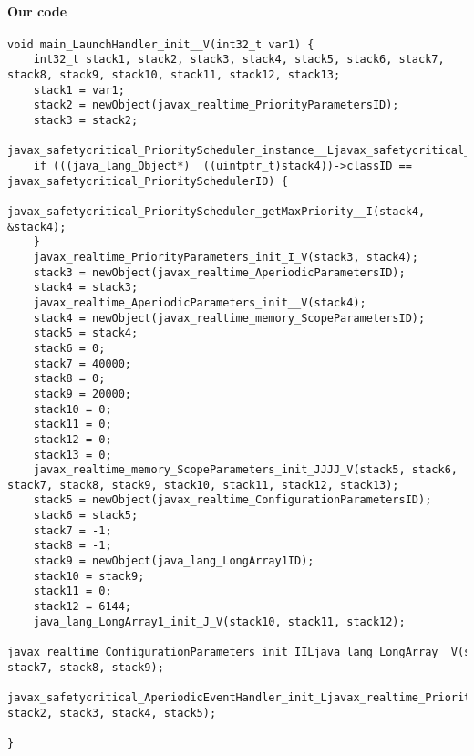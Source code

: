 \paragraph{Our code}\hfill
\begin{lstlisting}[firstnumber=2612]
void main_LaunchHandler_init__V(int32_t var1) {
	int32_t stack1, stack2, stack3, stack4, stack5, stack6, stack7, stack8, stack9, stack10, stack11, stack12, stack13;
	stack1 = var1;
	stack2 = newObject(javax_realtime_PriorityParametersID);
	stack3 = stack2;
	javax_safetycritical_PriorityScheduler_instance__Ljavax_safetycritical_PriorityScheduler_(&stack4);
	if (((java_lang_Object*)  ((uintptr_t)stack4))->classID == javax_safetycritical_PrioritySchedulerID) {
		javax_safetycritical_PriorityScheduler_getMaxPriority__I(stack4, &stack4);
	}
	javax_realtime_PriorityParameters_init_I_V(stack3, stack4);
	stack3 = newObject(javax_realtime_AperiodicParametersID);
	stack4 = stack3;
	javax_realtime_AperiodicParameters_init__V(stack4);
	stack4 = newObject(javax_realtime_memory_ScopeParametersID);
	stack5 = stack4;
	stack6 = 0;
	stack7 = 40000;
	stack8 = 0;
	stack9 = 20000;
	stack10 = 0;
	stack11 = 0;
	stack12 = 0;
	stack13 = 0;
	javax_realtime_memory_ScopeParameters_init_JJJJ_V(stack5, stack6, stack7, stack8, stack9, stack10, stack11, stack12, stack13);
	stack5 = newObject(javax_realtime_ConfigurationParametersID);
	stack6 = stack5;
	stack7 = -1;
	stack8 = -1;
	stack9 = newObject(java_lang_LongArray1ID);
	stack10 = stack9;
	stack11 = 0;
	stack12 = 6144;
	java_lang_LongArray1_init_J_V(stack10, stack11, stack12);
	javax_realtime_ConfigurationParameters_init_IILjava_lang_LongArray__V(stack6, stack7, stack8, stack9);
	javax_safetycritical_AperiodicEventHandler_init_Ljavax_realtime_PriorityParameters_Ljavax_realtime_AperiodicParameters_Ljavax_realtime_memory_ScopeParameters_Ljavax_realtime_ConfigurationParameters__V(stack1, stack2, stack3, stack4, stack5);

}
\end{lstlisting}

